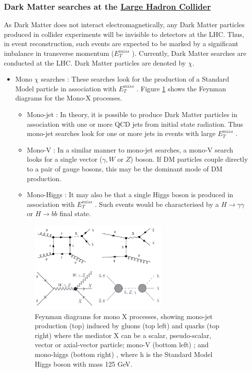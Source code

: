 \documentclass[11pt,a4paper,openright,twoside]{report}
\newcommand{\met}{$E_T^{miss}$ }
\begin{document}
\subsubsection{Dark Matter searches at the \hyperref[ch:LHC]{Large Hadron Collider}}

As Dark Matter does not interact electromagnetically, any Dark Matter particles produced in collider experiments will be invisible to detectors at the LHC. Thus, in event reconstruction, such events are expected to be marked by a significant imbalance in transverse momentum (\met). Currently, Dark Matter searches are conducted at the LHC\cite{DM_searches}. Dark Matter particles are denoted by $\chi$.
\begin{itemize}
\item Mono $\chi$ searches : These searches look for the production of a Standard Model particle in association with \met. Figure \ref{fig:Mono_X} shows the Feynman diagrams for the Mono-X processes.
	\begin{itemize}
	\item Mono-jet : In theory, it is possible to produce Dark Matter particles in association with one or more QCD jets from initial state radiation. Thus mono-jet searches look for one or more jets in events with large \met.
	\item Mono-V : In a similar manner to mono-jet searches, a mono-V search looks for a single vector ($\gamma,W$ or $Z$) boson. If DM particles couple directly to a pair of gauge bosons, this may be the dominant mode of DM production.
	\item Mono-Higgs : It may also be that a single Higgs boson is produced in association with \met. Such events would be characterised by a $H\to\gamma\gamma$ or $H\to bb$ final state.
	\end{itemize}
	
\begin{figure}[H]
\centering
\includegraphics[width=0.65\textwidth]{Mono_X.png}
\caption{Feynman diagrams for mono X processes, showing mono-jet production (top) induced by gluons (top left) and quarks (top right) \cite{mono_j} where the mediator X can be a scalar, pseudo-scalar, vector or axial-vector particle; mono-V (bottom left) \cite{mono_V}; and mono-higgs (bottom right) \cite{mono_h}, where h is the Standard Model Higgs boson with mass 125 GeV.}
\label{fig:Mono_X}
\end{figure}


\end{itemize}
\end{document}

